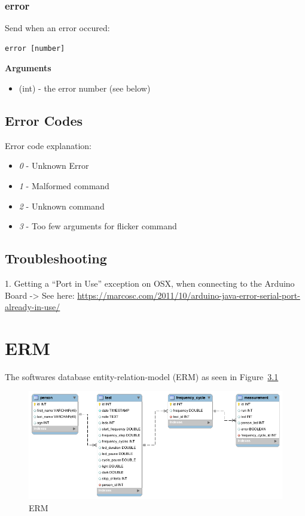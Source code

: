 \subsection{error}
\label{appendix/led-protocol:protocol-output-error}\label{appendix/led-protocol:error}
Send when an error occured:

\begin{verbatim}
error [number]
\end{verbatim}

\textbf{Arguments}
\begin{itemize}
\item {} 
 (int) - the error number (see below)

\end{itemize}


\section{Error Codes}
\label{appendix/led-protocol:error-codes}
Error code explanation:
\begin{itemize}
\item {} 
\emph{0} - Unknown Error

\item {} 
\emph{1} - Malformed command

\item {} 
\emph{2} - Unknown command

\item {} 
\emph{3} - Too few arguments for flicker command

\end{itemize}


\section{Troubleshooting}
\label{appendix/led-protocol:troubleshooting}
1. Getting a ``Port in Use'' exception on OSX, when connecting to the Arduino Board
-\textgreater{} See here: \href{https://marcosc.com/2011/10/arduino-java-error-serial-port-already-in-use/}{https://marcosc.com/2011/10/arduino-java-error-serial-port-already-in-use/}


\chapter{ERM}
\label{appendix/erm:erm}\label{appendix/erm::doc}
The softwares database entity-relation-model (ERM) as seen in Figure~\ref{fig:appendix-erm}

\begin{figure}[H]
	\includegraphics[width=\textwidth]{images/erm.png}
	\caption{ERM}
	\label{fig:appendix-erm}
\end{figure}

